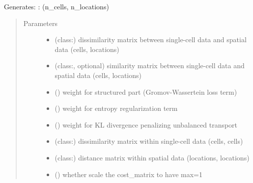 \documentclass[letterpaper,10pt,english]{sphinxmanual}
\begin{document}
\begin{fulllineitems}
\begin{fulllineitems}
Generates: : (n\_cells, n\_locations) 
\begin{quote}\begin{description}
\item[{Parameters}] \leavevmode\begin{itemize}
\item {} 
 (class:) \textendash{} dissimilarity matrix between single-cell data and spatial data (cells, locations)

\item {} 
 (class:, optional) \textendash{} similarity matrix between single-cell data and spatial data (cells, locations)

\item {} 
 (\sphinxstyleliteralemphasis{, }\sphinxstyleliteralemphasis{{[}}\sphinxstyleliteralemphasis{,}\sphinxstyleliteralemphasis{{]}}\sphinxstyleliteralemphasis{, }) \textendash{} weight for structured part (Gromov-Wassertein loss term)

\item {} 
 (\sphinxstyleliteralemphasis{, }) \textendash{} weight for entropy regularization term

\item {} 
 (\sphinxstyleliteralemphasis{, }) \textendash{} weight for KL divergence penalizing unbalanced transport

\item {} 
 (class:) \textendash{} dissimilarity matrix within single-cell data (cells, cells)

\item {} 
 (class:) \textendash{} distance matrix within spatial data (locations, locations)

\item {} 
 (\sphinxstyleliteralemphasis{, }) \textendash{} whether scale the cost\_matrix to have max=1


\end{itemize}
\end{description}
\end{quote}
\end{fulllineitems}
\end{fulllineitems}
\end{document}
